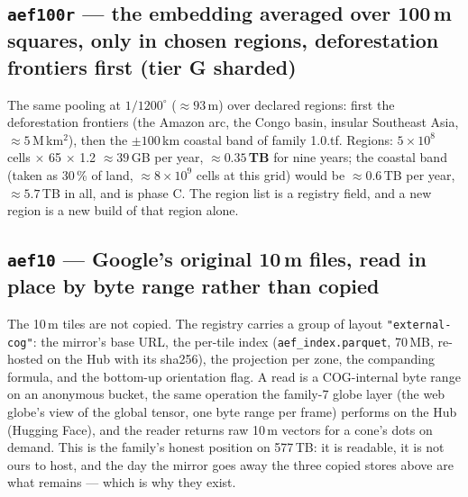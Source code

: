 \documentclass[10pt]{article}
\newcommand{\code}[1]{\texttt{#1}}
\begin{document}
\subsection{\code{aef100r} --- the embedding averaged over 100\,m squares, only in chosen regions, deforestation frontiers first (tier G sharded)}

The same pooling at $1/1200^\circ$ ($\approx 93$\,m) over declared regions:
first the deforestation frontiers (the Amazon arc, the Congo basin, insular
Southeast Asia, $\approx 5$\,M\,km$^2$), then the $\pm 100$\,km coastal band
of family 1.0.tf. Regions: $5 \times 10^8$ cells $\times$ 65 $\times$ 1.2
$\approx 39$\,GB per year, \textbf{$\approx 0.35$\,TB} for nine years; the
coastal band (taken as 30\,\% of land, $\approx 8 \times 10^9$ cells at this
grid) would be $\approx 0.6$\,TB per year, $\approx 5.7$\,TB in all, and is
phase C. The region list is a registry field, and a
new region is a new build of that region alone.

\subsection{\code{aef10} --- Google's original 10\,m files, read in place by byte range rather than copied}\label{sec:aef10}

The 10\,m tiles are not copied. The registry carries a group of layout
\code{"external-cog"}: the mirror's base URL, the per-tile index
(\code{aef\_index.parquet}, 70\,MB, re-hosted on the Hub with its sha256),
the projection per zone, the companding formula, and the bottom-up
orientation flag. A read is a COG-internal byte range on an anonymous
bucket, the same operation the family-7 globe layer (the web globe's view of the global tensor, one byte range per frame) performs on the Hub (Hugging Face),
and the reader returns raw 10\,m vectors for a cone's dots on demand. This
is the family's honest position on 577\,TB: it is readable, it is not ours
to host, and the day the mirror goes away the three copied stores above are
what remains --- which is why they exist.
\end{document}
